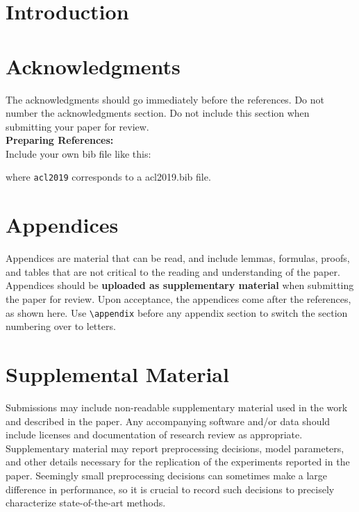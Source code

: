 \documentclass[11pt,a4paper]{article}
\begin{document}
\section{Introduction}
\cite{Celikyilmaz2018}


\section*{Acknowledgments}

The acknowledgments should go immediately before the references.  Do
not number the acknowledgments section. Do not include this section
when submitting your paper for review. \\

\noindent \textbf{Preparing References:} \\
Include your own bib file like this:
\verb||
\verb|| 

where \verb|acl2019| corresponds to a acl2019.bib file.



\appendix

\section{Appendices}
\label{sec:appendix}
Appendices are material that can be read, and include lemmas, formulas, proofs, and tables that are not critical to the reading and understanding of the paper. 
Appendices should be \textbf{uploaded as supplementary material} when submitting the paper for review. Upon acceptance, the appendices come after the references, as shown here. Use
\verb|\appendix| before any appendix section to switch the section
numbering over to letters.


\section{Supplemental Material}
\label{sec:supplemental}
Submissions may include non-readable supplementary material used in the work and described in the paper. Any accompanying software and/or data should include licenses and documentation of research review as appropriate. Supplementary material may report preprocessing decisions, model parameters, and other details necessary for the replication of the experiments reported in the paper. Seemingly small preprocessing decisions can sometimes make a large difference in performance, so it is crucial to record such decisions to precisely characterize state-of-the-art methods. 
\end{document}
